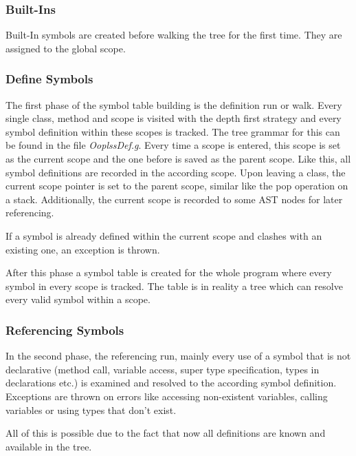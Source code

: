 \subsubsection{Built-Ins}
Built-In symbols are created before walking the tree for the first time.
They are assigned to the global scope.

\subsubsection{Define Symbols}
The first phase of the symbol table building is the definition run
or walk.  Every single class, method and scope is visited with the
depth first strategy and every symbol definition within these scopes
is tracked.  The tree grammar for this can be found in the file
\emph{OoplssDef.g}. Every time a scope is entered, this scope is set
as the current scope and the one before is saved as the parent scope.
Like this, all symbol definitions are recorded in the according scope.
Upon leaving a class, the current scope pointer is set to
the parent scope, similar like the pop operation on a stack.
Additionally, the current scope is recorded to some AST nodes for later
referencing.

If a symbol is already defined within the current scope and clashes with
an existing one, an exception is thrown.

After this phase a symbol table is created for the whole program where
every symbol in every scope is tracked. The table is in reality a tree
which can resolve every valid symbol within a scope.


\subsubsection{Referencing Symbols}
In the second phase, the referencing run, mainly every use of a symbol that is 
not declarative (method call, variable access, super type specification, types 
in declarations etc.) is examined and resolved to the according symbol definition. 
Exceptions are thrown on errors like accessing non-existent variables, calling 
variables or using types that don't exist.

All of this is possible due to the fact that now all definitions are known and available
in the tree.

